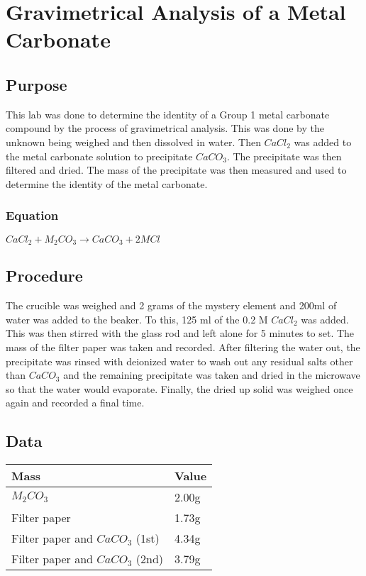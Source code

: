 \documentclass{article}
\begin{document}
\section{Gravimetrical Analysis of a Metal Carbonate}

\subsection{Purpose}

This lab was done to determine the identity of a Group 1 metal carbonate
compound by the process of gravimetrical analysis. This was done by the unknown
being weighed and then dissolved in water. Then \(CaCl_2\) was added to the
metal carbonate solution to precipitate \(CaCO_3\). The precipitate was then
filtered and dried. The mass of the precipitate was then measured and used to
determine the identity of the metal carbonate.

\subsubsection{Equation}
\(CaCl_2 + M_2CO_3 \rightarrow CaCO_3 + 2MCl\)

\subsection{Procedure}

The crucible was weighed and 2 grams of the mystery element and 200ml of water
was added to the beaker. To this, 125 ml of the 0.2 M \(CaCl_2\) was added.
This was then stirred with the glass rod and left alone for 5 minutes to set.
The mass of the filter paper was taken and recorded. After filtering the water
out, the precipitate was rinsed with deionized water to wash out any residual
salts other than \(CaCO_3\) and the remaining precipitate was taken and dried
in the microwave so that the water would evaporate. Finally, the dried up solid
was weighed once again and recorded a final time.

\subsection{Data}

\begin{tabular}{p{5cm}|p{2cm}}
    \toprule
    Mass & Value \\
    \midrule
    \(M_2CO_3\) & 2.00g \\
    Filter paper & 1.73g \\
    Filter paper and \(CaCO_3\) (1st) & 4.34g \\
    Filter paper and \(CaCO_3\) (2nd) & 3.79g \\
\end{tabular}
\end{document}
